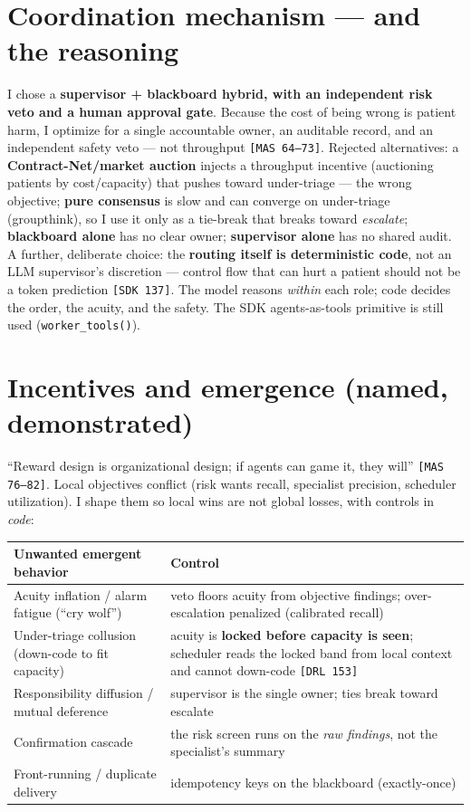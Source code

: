 \documentclass[11pt]{article}
\newcommand{\code}[1]{\texttt{#1}}
\begin{document}
\section{Coordination mechanism --- and the reasoning}
I chose a \textbf{supervisor + blackboard hybrid, with an independent risk veto and a human
approval gate}. Because the cost of being wrong is patient harm, I optimize for a single
accountable owner, an auditable record, and an independent safety veto --- not throughput
\code{[MAS 64--73]}. Rejected alternatives: a \textbf{Contract-Net/market auction} injects a
throughput incentive (auctioning patients by cost/capacity) that pushes toward under-triage ---
the wrong objective; \textbf{pure consensus} is slow and can converge on under-triage
(groupthink), so I use it only as a tie-break that breaks toward \emph{escalate};
\textbf{blackboard alone} has no clear owner; \textbf{supervisor alone} has no shared audit. A
further, deliberate choice: the \textbf{routing itself is deterministic code}, not an LLM
supervisor's discretion --- control flow that can hurt a patient should not be a token
prediction \code{[SDK 137]}. The model reasons \emph{within} each role; code decides the order,
the acuity, and the safety. The SDK agents-as-tools primitive is still used (\code{worker\_tools()}).

\section{Incentives and emergence (named, demonstrated)}
``Reward design is organizational design; if agents can game it, they will'' \code{[MAS 76--82]}.
Local objectives conflict (risk wants recall, specialist precision, scheduler utilization). I
shape them so local wins are not global losses, with controls in \emph{code}:

\begin{center}\small
\begin{tabular}{@{}p{5.2cm}p{8.0cm}@{}}
\toprule
\textbf{Unwanted emergent behavior} & \textbf{Control} \\
\midrule
Acuity inflation / alarm fatigue (``cry wolf'') & veto floors acuity from objective findings; over-escalation penalized (calibrated recall) \\
Under-triage collusion (down-code to fit capacity) & acuity is \textbf{locked before capacity is seen}; scheduler reads the locked band from local context and cannot down-code \code{[DRL 153]} \\
Responsibility diffusion / mutual deference & supervisor is the single owner; ties break toward escalate \\
Confirmation cascade & the risk screen runs on the \emph{raw findings}, not the specialist's summary \\
Front-running / duplicate delivery & idempotency keys on the blackboard (exactly-once) \\
\bottomrule
\end{tabular}
\end{center}
\end{document}
